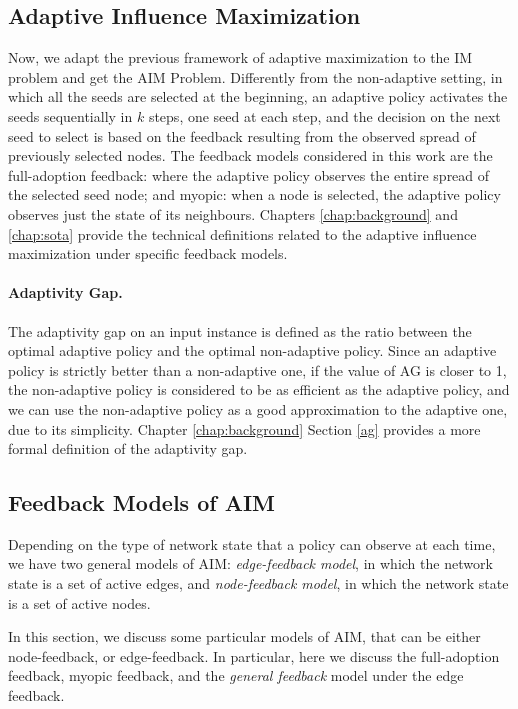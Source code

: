 \subsection{Adaptive Influence Maximization} 
Now, we adapt the previous framework of adaptive maximization to the IM problem and get the AIM Problem.
Differently from the non-adaptive setting, in which all the seeds are selected at the beginning, an adaptive policy activates the seeds sequentially in $k$ steps,
one seed at each step, and the decision on the next seed to select is based on the feedback resulting from the observed spread of previously selected nodes. The feedback models considered in this work are the full-adoption feedback: where the adaptive policy observes the entire spread of the selected seed node; and myopic: when a node is selected, the adaptive policy observes just the state of its neighbours. 
Chapters \ref{chap:background} and \ref{chap:sota} provide the technical definitions related to the adaptive influence maximization under specific feedback models.


\paragraph*{Adaptivity Gap.} The adaptivity gap on an input instance is defined as the ratio between the optimal adaptive policy and the optimal non-adaptive policy. Since an adaptive policy is strictly better than a non-adaptive one, if the value of AG is closer to 1, the non-adaptive policy is considered to be as efficient as the adaptive policy, and we can use the non-adaptive policy as a good approximation to the adaptive one, due to its simplicity. Chapter \ref{chap:background} Section \ref{ag} provides a more formal definition of the adaptivity gap.






\subsection{Feedback Models of AIM} \label{feedback}
Depending on the type of network state that a policy can observe at each time, we have two general models of AIM: {\em edge-feedback model}, in which the network state is a set of active edges, and {\em node-feedback model}, in which the network state is a set of active nodes.

In this section, we discuss some particular models of AIM, that can be either node-feedback, or edge-feedback. In particular, here we discuss the full-adoption feedback, myopic feedback, and the \emph{general feedback} model under the edge feedback.

